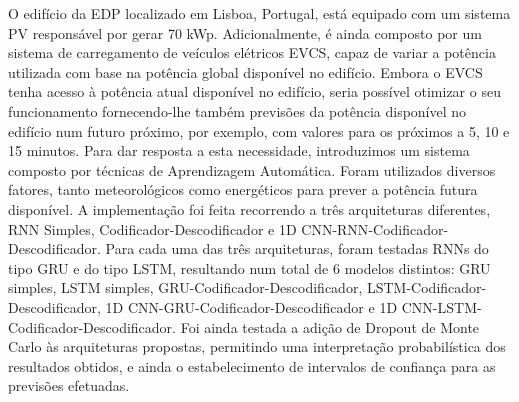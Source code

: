 \noindent O edifício da \ac{EDP} localizado em Lisboa, Portugal, está equipado com um sistema \ac{PV} responsável por gerar 70 kWp. Adicionalmente, é ainda composto por um sistema de carregamento de veículos elétricos \ac{EVCS}, capaz de variar a potência utilizada com base na potência global disponível no edifício. Embora o \ac{EVCS} tenha acesso à potência atual disponível no edifício, seria possível otimizar o seu funcionamento fornecendo-lhe também previsões da potência disponível no edifício num futuro próximo, por exemplo, com valores para os próximos a 5, 10 e 15 minutos. Para dar resposta a esta necessidade, introduzimos um sistema composto por técnicas de Aprendizagem Automática. Foram utilizados diversos fatores, tanto meteorológicos como energéticos para prever a potência futura disponível. A implementação foi feita recorrendo a três arquiteturas diferentes, \ac{RNN} Simples, Codificador-Descodificador e \ac{1D CNN}-\ac{RNN}-Codificador-Descodificador. Para cada uma das três arquiteturas, foram testadas \ac{RNN}s do tipo \ac{GRU} e do tipo \ac{LSTM}, resultando num total de 6 modelos distintos: \ac{GRU} simples, \ac{LSTM} simples, \ac{GRU}-Codificador-Descodificador, \ac{LSTM}-Codificador-Descodificador, \ac{1D CNN}-\ac{GRU}-Codificador-Descodificador e \ac{1D CNN}-\ac{LSTM}-Codificador-Descodificador. Foi ainda testada a adição de Dropout de Monte Carlo às arquiteturas propostas, permitindo uma interpretação probabilística dos resultados obtidos, e ainda o estabelecimento de intervalos de confiança para as previsões efetuadas. 